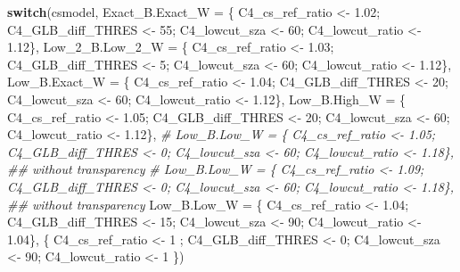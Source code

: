 \documentclass[
  10pt,
  a4paper,oneside]{article}
\newenvironment{Shaded}{\begin{snugshade}}{\end{snugshade}}
\newcommand{\AttributeTok}[1]{\textcolor[rgb]{0.13,0.29,0.53}{#1}}
\newcommand{\CommentTok}[1]{\textcolor[rgb]{0.56,0.35,0.01}{\textit{#1}}}
\newcommand{\ControlFlowTok}[1]{\textcolor[rgb]{0.13,0.29,0.53}{\textbf{#1}}}
\newcommand{\DecValTok}[1]{\textcolor[rgb]{0.00,0.00,0.81}{#1}}
\newcommand{\FloatTok}[1]{\textcolor[rgb]{0.00,0.00,0.81}{#1}}
\newcommand{\NormalTok}[1]{#1}
\newcommand{\OtherTok}[1]{\textcolor[rgb]{0.56,0.35,0.01}{#1}}
\begin{document}
\begin{Shaded}
\begin{Highlighting}[]
\ControlFlowTok{switch}\NormalTok{(csmodel,}
       \AttributeTok{Exact\_B.Exact\_W =}\NormalTok{ \{ C4\_cs\_ref\_ratio }\OtherTok{\textless{}{-}} \FloatTok{1.02}\NormalTok{; C4\_GLB\_diff\_THRES }\OtherTok{\textless{}{-}} \DecValTok{55}\NormalTok{; C4\_lowcut\_sza }\OtherTok{\textless{}{-}} \DecValTok{60}\NormalTok{; C4\_lowcut\_ratio }\OtherTok{\textless{}{-}} \FloatTok{1.12}\NormalTok{\},}
       \AttributeTok{Low\_2\_B.Low\_2\_W =}\NormalTok{ \{ C4\_cs\_ref\_ratio }\OtherTok{\textless{}{-}} \FloatTok{1.03}\NormalTok{; C4\_GLB\_diff\_THRES }\OtherTok{\textless{}{-}}  \DecValTok{5}\NormalTok{; C4\_lowcut\_sza }\OtherTok{\textless{}{-}} \DecValTok{60}\NormalTok{; C4\_lowcut\_ratio }\OtherTok{\textless{}{-}} \FloatTok{1.12}\NormalTok{\},}
       \AttributeTok{Low\_B.Exact\_W   =}\NormalTok{ \{ C4\_cs\_ref\_ratio }\OtherTok{\textless{}{-}} \FloatTok{1.04}\NormalTok{; C4\_GLB\_diff\_THRES }\OtherTok{\textless{}{-}} \DecValTok{20}\NormalTok{; C4\_lowcut\_sza }\OtherTok{\textless{}{-}} \DecValTok{60}\NormalTok{; C4\_lowcut\_ratio }\OtherTok{\textless{}{-}} \FloatTok{1.12}\NormalTok{\},}
       \AttributeTok{Low\_B.High\_W    =}\NormalTok{ \{ C4\_cs\_ref\_ratio }\OtherTok{\textless{}{-}} \FloatTok{1.05}\NormalTok{; C4\_GLB\_diff\_THRES }\OtherTok{\textless{}{-}} \DecValTok{20}\NormalTok{; C4\_lowcut\_sza }\OtherTok{\textless{}{-}} \DecValTok{60}\NormalTok{; C4\_lowcut\_ratio }\OtherTok{\textless{}{-}} \FloatTok{1.12}\NormalTok{\},}
       \CommentTok{\# Low\_B.Low\_W     = \{ C4\_cs\_ref\_ratio \textless{}{-} 1.05; C4\_GLB\_diff\_THRES \textless{}{-}  0; C4\_lowcut\_sza \textless{}{-} 60; C4\_lowcut\_ratio \textless{}{-} 1.18\}, \#\# without transparency}
       \CommentTok{\# Low\_B.Low\_W     = \{ C4\_cs\_ref\_ratio \textless{}{-} 1.09; C4\_GLB\_diff\_THRES \textless{}{-}  0; C4\_lowcut\_sza \textless{}{-} 60; C4\_lowcut\_ratio \textless{}{-} 1.18\}, \#\# without transparency}
       \AttributeTok{Low\_B.Low\_W     =}\NormalTok{ \{ C4\_cs\_ref\_ratio }\OtherTok{\textless{}{-}} \FloatTok{1.04}\NormalTok{; C4\_GLB\_diff\_THRES }\OtherTok{\textless{}{-}} \DecValTok{15}\NormalTok{; C4\_lowcut\_sza }\OtherTok{\textless{}{-}} \DecValTok{90}\NormalTok{; C4\_lowcut\_ratio }\OtherTok{\textless{}{-}} \FloatTok{1.04}\NormalTok{\},}
\NormalTok{                         \{ C4\_cs\_ref\_ratio }\OtherTok{\textless{}{-}} \DecValTok{1}\NormalTok{   ; C4\_GLB\_diff\_THRES }\OtherTok{\textless{}{-}}  \DecValTok{0}\NormalTok{; C4\_lowcut\_sza }\OtherTok{\textless{}{-}} \DecValTok{90}\NormalTok{; C4\_lowcut\_ratio }\OtherTok{\textless{}{-}} \DecValTok{1}\NormalTok{   \})}



\end{Highlighting}
\end{Shaded}
\end{document}

